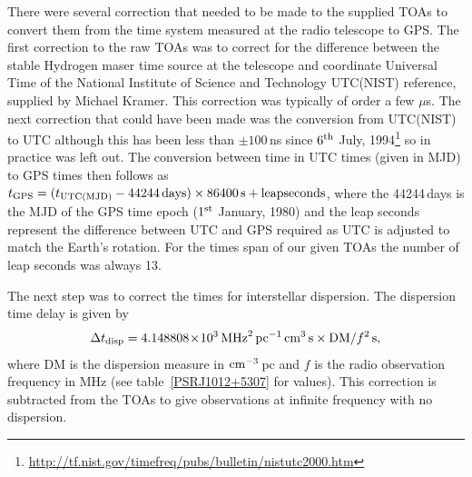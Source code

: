 There were several correction that needed to be made to the supplied TOAs to convert them from the
time system measured at the radio telescope to GPS. The first correction to the raw TOAs was to
correct for the difference between the stable Hydrogen maser time source at the telescope and
coordinate Universal Time of the National Institute of Science and Technology UTC(NIST) reference,
supplied by Michael Kramer. This correction was typically of order a few $\mu$s. The next
correction that could have been made was the conversion from UTC(NIST) to UTC although this has been
less than $\pm 100$\,ns since $6^{\rm{th}}$ July,
1994\footnote{\url{http://tf.nist.gov/timefreq/pubs/bulletin/nistutc2000.htm}} so in practice was
left out. The conversion between time in UTC times (given in MJD) to GPS times then follows as
$t_{\rm{GPS}} = (t_{\rm{UTC(MJD)}} - 44244\,{\rm{days}})\times86400\,{\rm{s}} + {\rm{leap
seconds}}$, where the 44244\,days is the MJD of the GPS time epoch ($1^{\rm{st}}$ January, 1980)
and the leap seconds represent the difference between UTC and GPS required as UTC is adjusted to
match the Earth's rotation. For the times span of our given TOAs the number of leap seconds was
always 13.

The next step was to correct the times for interstellar dispersion. The dispersion time
delay is given by
\begin{equation}
\Delta{}t_{\rm{disp}} =
4.148808\!\times\!10^{3}\,{\rm{MHz}}^2\,{\rm{pc}}^{-1}\,{\rm{cm}}^3\,{\rm s}\times{\rm{DM}}/f^2\,{\rm s},
\end{equation}
where DM is the dispersion measure in ${\rm{cm}}^{-3}$\,pc and $f$ is the radio observation
frequency in MHz (see table~\ref{PSRJ1012+5307} for values). This correction is subtracted from the
TOAs to give observations at infinite frequency with no dispersion. 

